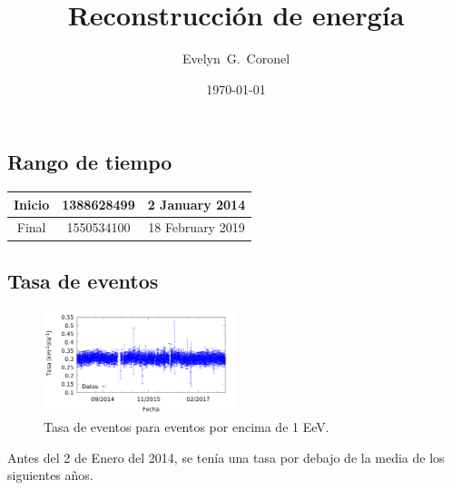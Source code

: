 



\title{Reconstrucción de energía}
\author{Evelyn~G.~Coronel}


\date[]{\lowercase{\today}} %


\maketitle


\subsection{Rango de tiempo}
\begin{table}[H]
\centering
\begin{tabular}{c|c|c}
Inicio & 1388628499 & 2 January 2014 \\ \hline
Final  & 1550534100 & 18 February 2019 \\
\end{tabular}
\end{table}

\subsection{Tasa de eventos}

\begin{figure}[H]
	\centering
	\includegraphics[width=0.5\textwidth]{rate_1_EeV.png}
	\caption{Tasa de eventos para eventos por encima de 1 EeV.}
\end{figure}

Antes del 2 de Enero del 2014, se tenía una tasa por debajo de la media de los siguientes años.

